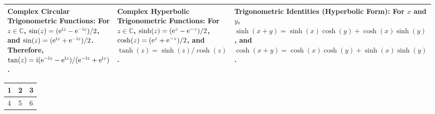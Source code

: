 \begin{tabular}{|m{.31\linewidth}|m{.31\linewidth}|m{.31\linewidth}|}
        \textbf{Complex Circular Trigonometric Functions}: For
        $z\in\mathbb{C}$, $\sin(z)=(\mathrm{e}^{\mathrm{i}z}-
        \mathrm{e}^{-\mathrm{i}z})/2$, and $\sin(z)=(\mathconst{e}%
        ^{\mathconst{i}z}+\mathconst{e}^{-\mathconst{i}z})/2$. Therefore,
        $\tan(z)=\mathconst{i}(\mathconst{e}^{-\mathconst{i}z}-\mathconst{e}%
        ^{\mathconst{i}z})/(\mathconst{e}^{-\mathconst{i}z}+\mathconst{e}%
        ^{\mathconst{i}z})$. &
        \textbf{Complex Hyperbolic Trigonometric Functions}: For
        $z\in\mathbb{C}$, $\sinh(z)=(\mathrm{e}^z-\mathrm{e}^{-z})/2$,
        $\cosh(z)=(\mathrm{e}^z+\mathrm{e}^{-z})/2$, and
        $\tanh(z)=\sinh(z)/\cosh(z)$. &
        \textbf{Trigonometric Identities (Hyperbolic Form)}: For $x$ and $y$,
        $\sinh(x+y)=\sinh(x)\cosh(y) + \cosh(x)\sinh(y)$, and
        $\cosh(x+y)=\cosh(x)\cosh(y) + \sinh(x)\sinh(y)$. \\
        \hline
\end{tabular}
\clearpage
%
%
\begin{tabular}{|m{.31\linewidth}|m{.31\linewidth}|m{.31\linewidth}|}
        \hline
        1 & 2 & 3 \\
        \hline
        4 & 5 & 6 \\
        \hline
\end{tabular}


